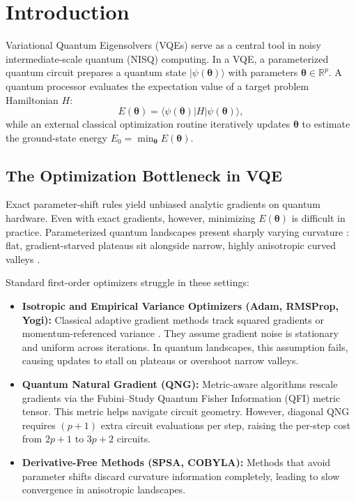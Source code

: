 \documentclass[11pt,a4paper]{article}
\begin{document}
\section{Introduction}
\label{sec:intro}

Variational Quantum Eigensolvers (VQEs) \cite{peruzzo2014variational,mcclean2016theory} serve as a central tool in noisy intermediate-scale quantum (NISQ) computing. In a VQE, a parameterized quantum circuit prepares a quantum state $|\psi(\boldsymbol{\theta})\rangle$ with parameters $\boldsymbol{\theta} \in \mathbb{R}^p$. A quantum processor evaluates the expectation value of a target problem Hamiltonian $H$:
\begin{equation}
E(\boldsymbol{\theta}) = \langle \psi(\boldsymbol{\theta}) | H | \psi(\boldsymbol{\theta}) \rangle,
\label{eq:vqe_cost}
\end{equation}
while an external classical optimization routine iteratively updates $\boldsymbol{\theta}$ to estimate the ground-state energy $E_0 = \min_{\boldsymbol{\theta}} E(\boldsymbol{\theta})$.

\subsection{The Optimization Bottleneck in VQE}
Exact parameter-shift rules \cite{mitarai2018quantum,schuld2019evaluating} yield unbiased analytic gradients on quantum hardware. Even with exact gradients, however, minimizing $E(\boldsymbol{\theta})$ is difficult in practice. Parameterized quantum landscapes present sharply varying curvature \cite{mcclean2018barren,cerezo2021cost}: flat, gradient-starved plateaus sit alongside narrow, highly anisotropic curved valleys \cite{mcclean2018barren,cerezo2021cost,wierichs2020avoiding}.

Standard first-order optimizers struggle in these settings:
\begin{itemize}
    \item \textbf{Isotropic and Empirical Variance Optimizers (Adam, RMSProp, Yogi):} Classical adaptive gradient methods \cite{kingma2014adam,tieleman2012lecture,zaheer2018adaptive} track squared gradients or momentum-referenced variance \cite{zhuang2020adabelief}. They assume gradient noise is stationary and uniform across iterations. In quantum landscapes, this assumption fails, causing updates to stall on plateaus or overshoot narrow valleys.
    \item \textbf{Quantum Natural Gradient (QNG):} Metric-aware algorithms \cite{stokes2020quantum,wierichs2020avoiding} rescale gradients via the Fubini--Study Quantum Fisher Information (QFI) metric tensor. This metric helps navigate circuit geometry. However, diagonal QNG requires $(p+1)$ extra circuit evaluations per step, raising the per-step cost from $2p+1$ to $3p+2$ circuits.
    \item \textbf{Derivative-Free Methods (SPSA, COBYLA):} Methods that avoid parameter shifts \cite{spall1992multivariate,novak2025benchmarking} discard curvature information completely, leading to slow convergence in anisotropic landscapes.
\end{itemize}
\end{document}
